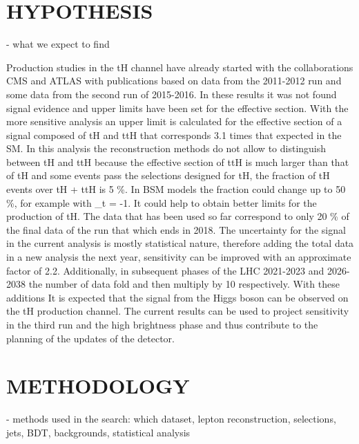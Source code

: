 \documentclass[final,3p]{CSP}
\begin{document}

\section{HYPOTHESIS}
- what we expect to find

Production studies in the tH channel have already started with the collaborations CMS and ATLAS with publications based on data from the 
2011-2012 run and some data from the second run of 2015-2016. In these results it was not found signal evidence and upper limits have 
been set for the effective section. With the more sensitive analysis an upper limit is calculated for the effective section of a signal 
composed of tH and ttH that corresponds 3.1 times that expected in the SM. In this analysis the reconstruction methods do not allow to 
distinguish between tH and ttH because the effective section of ttH is much larger than that of tH and some events pass the
selections designed for tH, the fraction of tH events over tH + ttH is 5 \%. In BSM models the fraction could change up to 50 \%, for 
example with \kappa_t = -1. It could help to obtain better limits for the production of tH. The data that has been used so far 
correspond to only 20 \% of the final data of the run that which ends in 2018. The uncertainty for the signal in the current analysis is 
mostly statistical nature, therefore adding the total data in a new analysis the next year, sensitivity can be improved with an 
approximate factor of 2.2. Additionally, in subsequent phases of the LHC 2021-2023 and 2026-2038 the number of data fold and then 
multiply by 10 respectively. With these additions It is expected that the signal from the Higgs boson can be observed on the tH 
production channel. The current results can be used to project sensitivity in the third run and the high brightness phase and thus 
contribute to the planning of the updates of the detector.

\section{METHODOLOGY}
- methods used in the search: which dataset,  lepton reconstruction, selections, jets, BDT, backgrounds, statistical analysis
\end{document}
